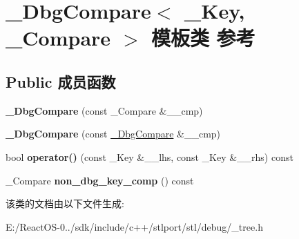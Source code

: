 \hypertarget{class___dbg_compare}{}\section{\+\_\+\+Dbg\+Compare$<$ \+\_\+\+Key, \+\_\+\+Compare $>$ 模板类 参考}
\label{class___dbg_compare}
\subsection*{Public 成员函数}
\begin{DoxyCompactItemize}
\item 
\mbox{\label{class___dbg_compare_a2124e0ac04cd1c2599ef3211944c8e20}} 
{\bfseries \+\_\+\+Dbg\+Compare} (const \+\_\+\+Compare \&\+\_\+\+\_\+cmp)
\item 
\mbox{\label{class___dbg_compare_a93dcdef00f8dc9c0d53dcbd3712bafb2}} 
{\bfseries \+\_\+\+Dbg\+Compare} (const \hyperlink{class___dbg_compare}{\+\_\+\+Dbg\+Compare} \&\+\_\+\+\_\+cmp)
\item 
\mbox{\label{class___dbg_compare_a1e489e51ad46facfe4e74d9d498dccc9}} 
bool {\bfseries operator()} (const \+\_\+\+Key \&\+\_\+\+\_\+lhs, const \+\_\+\+Key \&\+\_\+\+\_\+rhs) const
\item 
\mbox{\label{class___dbg_compare_a7b456c30af5ece51d0e6fea8dc5ffba5}} 
\+\_\+\+Compare {\bfseries non\+\_\+dbg\+\_\+key\+\_\+comp} () const
\end{DoxyCompactItemize}


该类的文档由以下文件生成\+:\begin{DoxyCompactItemize}
\item 
E\+:/\+React\+O\+S-\/0../sdk/include/c++/stlport/stl/debug/\+\_\+tree.\+h\end{DoxyCompactItemize}
